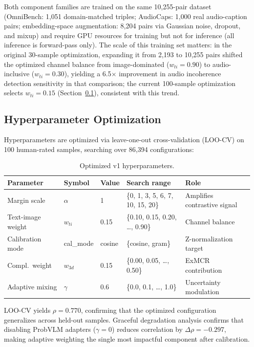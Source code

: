 \documentclass[a4paper,fleqn]{cas-sc}
\begin{document}
\begin{itemize}
Both component families are trained on the same 10,255-pair dataset (OmniBench: 1,051 domain-matched triples; AudioCaps: 1,000 real audio-caption pairs; embedding-space augmentation: 8,204 pairs via Gaussian noise, dropout, and mixup) and require GPU resources for training but not for inference (all inference is forward-pass only). The scale of this training set matters: in the original 30-sample optimization, expanding it from 2,193 to 10,255 pairs shifted the optimized channel balance from image-dominated ($w_{ti} = 0.90$) to audio-inclusive ($w_{ti} = 0.30$), yielding a 6.5$\times$ improvement in audio incoherence detection sensitivity in that comparison; the current 100-sample optimization selects $w_{ti} = 0.15$ (Section~\ref{sec:v1-hyperparams}), consistent with this trend.


\subsection{Hyperparameter Optimization}\label{sec:v1-hyperparams}

Hyperparameters are optimized via leave-one-out cross-validation (LOO-CV) on 100 human-rated samples, searching over 86,394 configurations:

\begin{table}[t]
\caption{Optimized v1 hyperparameters.}\label{tab:v1-hyperparams}
\centering
\small
\begin{tabular}{lllll}
\toprule
Parameter & Symbol & Value & Search range & Role \\
\midrule
Margin scale & $\alpha$ & 1 & \{0, 1, 3, 5, 6, 7, 10, 15, 20\} & Amplifies contrastive signal \\
Text-image weight & $w_{ti}$ & 0.15 & \{0.10, 0.15, 0.20, \ldots, 0.90\} & Channel balance \\
Calibration mode & cal\_mode & cosine & \{cosine, gram\} & Z-normalization target \\
Compl.\ weight & $w_{3d}$ & 0.15 & \{0.00, 0.05, \ldots, 0.50\} & ExMCR contribution \\
Adaptive mixing & $\gamma$ & 0.6 & \{0.0, 0.1, \ldots, 1.0\} & Uncertainty modulation \\
\bottomrule
\end{tabular}
\end{table}

LOO-CV yields $\rho = 0.770$, confirming that the optimized configuration generalizes across held-out samples. Graceful degradation analysis confirms that disabling ProbVLM adapters ($\gamma = 0$) reduces correlation by $\Delta\rho = -0.297$, making adaptive weighting the single most impactful component after calibration.


\end{itemize}
\end{document}
